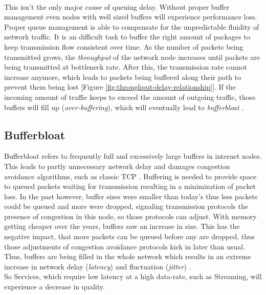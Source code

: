 \documentclass[a4paper,conference]{IEEEtran}
\begin{document}
\\This isn't the only major cause of queuing delay. Without proper buffer management even nodes with well sized buffers will experience performance loss. Proper queue management is able to compensate for the unpredictable fluidity of network traffic. It is an difficult task to buffer the right amount of packages to keep transmission flow consistent over time.
As the number of packets being transmitted grows, the \textit{throughput} of the network node increases until packets are being transmitted at bottleneck rate. After this, the transmission rate cannot increase anymore, which leads to packets being buffered along their path to prevent them being lost [Figure \ref{fig:throughput-delay-relationship}]\cite{gettys2012bufferbloat}. If the incoming amount of traffic keeps to exceed the amount of outgoing traffic, those buffers will fill up (\textit{over-buffering}), which will eventually lead to \textit{bufferbloat} \cite{Allman13commentson,6886125}.

\subsection*{Bufferbloat}
Bufferbloat refers to frequently full and excessively large buffers in internet nodes. This leads to partly unnecessary network delay and damages congestion avoidance algorithms, such as classic TCP \cite{gettys2012bufferbloat,chen2014bufferbloat}. Buffering is needed to provide space to queued packets waiting for transmission resulting in a minimization of packet loss. In the past however, buffer sizes were smaller than today's thus less packets could be queued and more were dropped, signaling transmission protocols the presence of congestion in this node, so those protocols can adjust. With memory getting cheaper over the years, buffers saw an increase in size. This has the negative impact, that more packets can be queued before any are dropped, thus those adjustments of congestion avoidance protocols kick in later than usual. Thus, buffers are being filled in the whole network which results in an extreme increase in network delay (\textit{latency}) and fluctuation (\textit{jitter}) \cite{gettys2012bufferbloat,staff2012bufferbloat,chen2014bufferbloat}.
\\So Services, which require low latency at a high data-rate, such as Streaming, will experience a decrease in quality.
\end{document}
